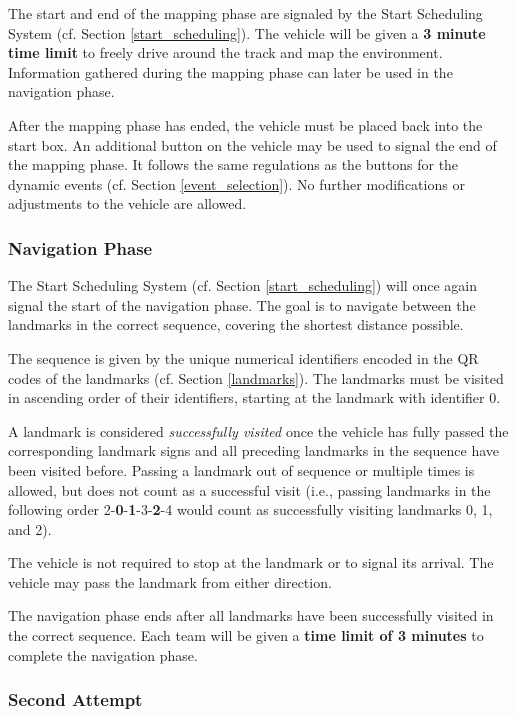 The start and end of the mapping phase are signaled by the Start Scheduling System (cf. Section \ref{start_scheduling}).
The vehicle will be given a \textbf{3 minute time limit} to freely drive around the track and map the environment.
Information gathered during the mapping phase can later be used in the navigation phase.

After the mapping phase has ended, the vehicle must be placed back into the start box.
An additional button on the vehicle may be used to signal the end of the mapping phase.
It follows the same regulations as the buttons for the dynamic events (cf. Section \ref{event_selection}).
No further modifications or adjustments to the vehicle are allowed.

\subsubsection{Navigation Phase}
\label{navigation_phase}

The Start Scheduling System (cf. Section \ref{start_scheduling}) will once again signal the start of the navigation phase.
The goal is to navigate between the landmarks in the correct sequence, covering the shortest distance possible.

The sequence is given by the unique numerical identifiers encoded in the QR codes of the landmarks (cf. Section {\ref{landmarks}}).
The landmarks must be visited in ascending order of their identifiers, starting at the landmark with identifier 0.

A landmark is considered \textit{successfully visited} once the vehicle has fully passed the corresponding landmark signs and all preceding landmarks in the sequence have been visited before.
Passing a landmark out of sequence or multiple times is allowed, but does not count as a successful visit (i.e., passing landmarks in the following order 2-\textbf{0}-\textbf{1}-3-\textbf{2}-4 would count as successfully visiting landmarks 0, 1, and 2).

The vehicle is not required to stop at the landmark or to signal its arrival.
The vehicle may pass the landmark from either direction.

The navigation phase ends after all landmarks have been successfully visited in the correct sequence.
Each team will be given a \textbf{time limit of 3 minutes} to complete the navigation phase.

\subsubsection{Second Attempt}

